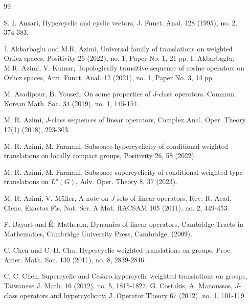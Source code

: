 \documentclass{amsart}
\theoremstyle{definition}\newtheorem{defn}[thm]{Definition}
\theoremstyle{remark}
\numberwithin{equation}{section}
\begin{document}
\begin{thebibliography}{99}

S. I. Ansari, Hypercyclic and cyclic vectors, J. Funct. Anal. 128 (1995), no. 2, 374-383.

I. Akbarbaglu and M.R. Azimi, Universal family of translations on
weighted Orlicz spaces, Positivity  26 (2022), no. 1, Paper No. 1,
21 pp.
 I. Akbarbaglu, M.R. Azimi, V. Kumar, Topologically transitive sequence
of cosine operators on Orlicz
spaces, Ann. Funct. Anal. 12 (2021), no. 1, Paper No. 3, 14 pp.

M. Asadipour, B. Yousefi, On some properties of $J$-class operators.
Commun. Korean Math. Soc. 34 (2019), no. 1, 145-154.

 M. R. Azimi,  $J$-class sequences of linear operators,
 Complex Anal. Oper. Theory 12(1) (2018), 293-303.

 M. R. Azimi, M. Farmani, Subspace-hypercyclicity of conditional
 weighted translations
 on locally compact groups, Positivity 26, 58 (2022).

  M. R. Azimi, M. Farmani, Subspace-supercyclicity of conditional
 weighted type translations on $L^p(G)$,
 Adv. Oper. Theory 8, 37 (2023).

  M. R. Azimi,  V. M\"{u}ller,  A note on $J$-sets of linear
 operators,
 Rev. R. Acad. Cienc.
 Exactas F\'{\i}s. Nat. Ser. A Mat. RACSAM 105 (2011), no. 2, 449-453.


F. Bayart and  \'{E}. Matheron, Dynamics of linear operators, Cambridge Tracts in Mathematics,
Cambridge University Press, Cambridge, (2009).


C. Chen and C.-H. Chu, Hypercyclic weighted translations on groups, Proc. Amer. Math.
Soc. 139 (2011), no. 8, 2839-2846.

C. C. Chen, Supercyclic and Ces$\grave{a}$ro hypercyclic weighted
translations on groups,
 Taiwanese J. Math. 16 (2012), no. 5, 1815-1827.
  G. Costakis, A. Manoussos,  $J$-class operators and hypercyclicity,
   J. Operator Theory 67 (2012), no. 1, 101-119.


\end{thebibliography}
\end{document}
